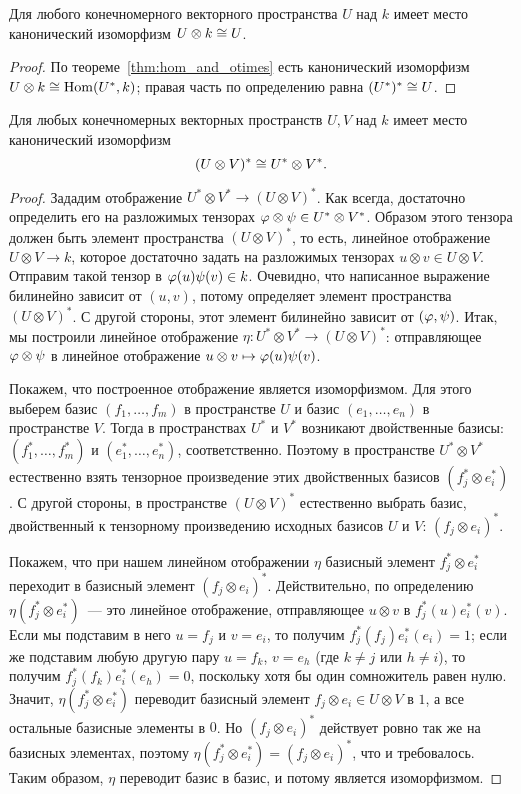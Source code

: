 \begin{corollary}\label{cor:u_otimes_k}
Для любого конечномерного векторного пространства $U$ над $k$ имеет
место канонический изоморфизм
$U\otimes k\cong U$.
\end{corollary}
\begin{proof}
По теореме~\ref{thm:hom_and_otimes} есть канонический изоморфизм
$U\otimes k\cong\operatorname{Hom}(U^*,k)$; правая часть по определению равна
$(U^*)^*\cong U$.
\end{proof}

\begin{theorem}\label{thm:duality_and_otimes}
Для любых конечномерных векторных пространств $U,V$ над $k$ имеет
место канонический изоморфизм
$$
(U\otimes V)^*\cong U^*\otimes V^*.
$$
\end{theorem}
\begin{proof}
Зададим отображение $U^*\otimes V^*\to (U\otimes V)^*$. Как всегда,
достаточно определить его на разложимых тензорах
$\varphi\otimes\psi\in U^*\otimes V^*$. Образом этого тензора должен быть
элемент пространства $(U\otimes V)^*$, то есть, линейное отображение
$U\otimes V\to k$, которое достаточно задать на разложимых тензорах
$u\otimes v\in U\otimes V$. Отправим такой тензор в
$\varphi(u)\psi(v)\in k$.
Очевидно, что написанное выражение билинейно зависит от $(u,v)$,
потому определяет элемент пространства $(U\otimes V)^*$. С другой
стороны, этот элемент билинейно зависит от $(\varphi,\psi)$.
Итак, мы построили линейное отображение
$\eta\colon U^*\otimes V^*\to (U\otimes V)^*$:
отправляющее $\varphi\otimes\psi$ в линейное отображение
$u\otimes v\mapsto \varphi(u)\psi(v)$.

Покажем, что построенное отображение является изоморфизмом. Для этого
выберем базис $(f_1,\dots,f_m)$ в пространстве $U$ и базис
$(e_1,\dots,e_n)$ в пространстве $V$. Тогда в пространствах $U^*$ и
$V^*$ возникают двойственные базисы: $(f_1^*,\dots,f_m^*)$ и
$(e_1^*,\dots,e_n^*)$, соответственно. Поэтому в пространстве
$U^*\otimes V^*$ естественно взять тензорное произведение этих
двойственных базисов $(f_j^*\otimes e_i^*)$. С другой стороны, в
пространстве $(U\otimes V)^*$ естественно выбрать базис, двойственный
к тензорному произведению исходных базисов $U$ и $V$:
$(f_j\otimes e_i)^*$.

Покажем, что при нашем линейном отображении
$\eta$ базисный элемент $f_j^*\otimes e_i^*$ переходит в базисный
элемент $(f_j\otimes e_i)^*$. Действительно,
по определению $\eta(f_j^*\otimes e_i^*)$~--- это линейное
отображение, отправляющее $u\otimes v$ в $f_j^*(u)e_i^*(v)$. Если мы
подставим в него $u=f_j$ и $v=e_i$, то получим $f_j^*(f_j)e_i^*(e_i) =
1$; если же подставим любую другую пару $u=f_k$, $v=e_h$ (где $k\neq
j$ или $h\neq i$), то получим $f_j^*(f_k)e_i^*(e_h) = 0$, поскольку
хотя бы один сомножитель равен нулю. Значит, $\eta(f_j^*\otimes
e_i^*)$ переводит базисный элемент $f_j\otimes e_i\in U\otimes V$ в
$1$, а все остальные базисные элементы в $0$. Но $(f_j\otimes e_i)^*$
действует ровно так же на базисных элементах, поэтому
$\eta(f_j^*\otimes e_i^*) = (f_j\otimes e_i)^*$, что и требовалось.
Таким образом, $\eta$ переводит базис в базис, и потому является
изоморфизмом.
\end{proof}

